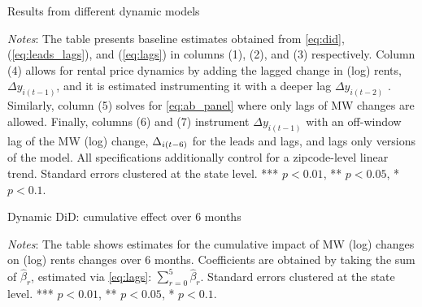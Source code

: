 
\begin{table}[h!]
    \caption{Results from different dynamic models}
    \label{tab:horse_race_main}
    \centering
    \resizebox{\textwidth}{!}{
	    \vspace{0pt}    
	    
    }
    \begin{minipage}{.95\textwidth} \footnotesize
		\vspace{1mm} 
		\textit{Notes}: The table presents baseline estimates obtained from \autoref{eq:did}, 
		(\ref{eq:leads_lags}), and (\ref{eq:lags}) in columns (1), (2), and (3) respectively. 
		Column (4) allows for rental price dynamics by adding the lagged change in (log) rents, 
		$\Delta y_{i(t-1)}$, and it is estimated instrumenting it with a deeper lag $\Delta 
		y_{i(t-2)}$ \parencite{arellano1991some}. Similarly, column (5) solves for 
		\autoref{eq:ab_panel} where only lags of MW changes are allowed. Finally, columns (6) and 
		(7) instrument $\Delta y_{i(t-1)}$ with an off-window lag of the MW (log) change, $\Delta 
		\title{MW}_{i(t-6)}$ for the leads and lags, and lags only versions of the model. All 
		specifications additionally control for a zipcode-level linear trend. Standard errors 
		clustered at the state level. *** $p < 0.01$, ** $p < 0.05$, * $p < 0.1$.   
	\end{minipage}
\end{table}

\clearpage
\begin{table}[h!]
    \caption{Dynamic DiD: cumulative effect over 6 months}
    \label{tab:dynamic_cumulative}
    \centering
    \resizebox{0.7\textwidth}{!}{
	    \vspace{0pt}    
	    
    }
    \begin{minipage}{.95\textwidth} \footnotesize
		\vspace{3mm} 
		\textit{Notes}: The table shows estimates for the cumulative impact of MW (log) changes 
		on (log) rents changes over 6 months. Coefficients are obtained by taking the sum of 
		$\hat{\beta}_{r}$, estimated via \autoref{eq:lags}: $\sum\limits_{r=0}^{5} \hat{\beta}_{r}$. 
		Standard errors clustered at the state level. *** $p < 0.01$, ** $p < 0.05$, * $p < 0.1$.   
	\end{minipage}
\end{table}

